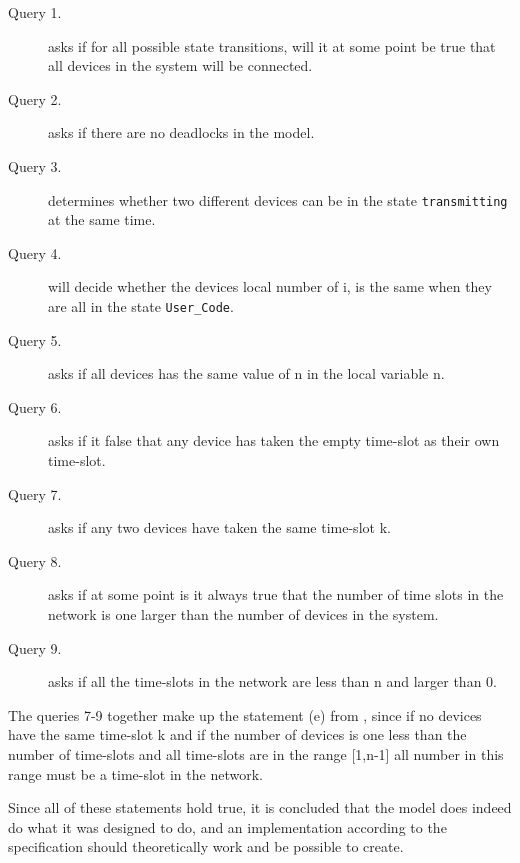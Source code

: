 \begin{description}
	\item [Query 1.] asks if for all possible state transitions, will it at some point be true that all devices in the system will be connected.
	\item [Query 2.] asks if there are no deadlocks in the model.
	\item [Query 3.] determines whether two different devices can be in the state \texttt{transmitting} at the same time.
	\item [Query 4.] will decide whether the devices local number of i, is the same when they are all in the state \texttt{User\_Code}.
	\item [Query 5.] asks if all devices has the same value of n in the local variable n.
	\item [Query 6.] asks if it false that any device has taken the empty time-slot as their own time-slot.
	\item [Query 7.] asks if any two devices have taken the same time-slot k.
	\item [Query 8.] asks if at some point is it always true that the number of time slots in the network is one larger than the number of devices in the system.
	\item [Query 9.] asks if all the time-slots in the network are less than n and larger than 0.
\end{description}

The queries 7-9 together make up the statement (e) from , since if no devices have the same time-slot k and if the number of devices is one less than the number of time-slots and all time-slots are in the range [1,n-1] all number in this range must be a time-slot in the network.

Since all of these statements hold true, it is concluded that the model does indeed do what it was designed to do, and an implementation according to the specification should theoretically work and be possible to create.
